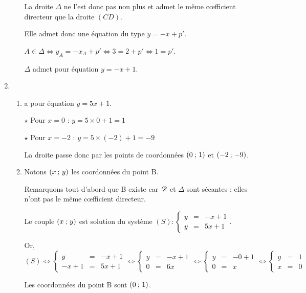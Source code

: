 \documentclass[10pt,french]{article}
\begin{document}
\begin{enumerate}[label=\arabic*.]
\begin{enumerate}[label=\alph*)]
	La droite $\Delta$ ne l'est donc pas non plus et admet le même c\oe{}fficient directeur que la droite $(CD)$.
	
	Elle admet donc une équation du type $y=-x+p'$.
	
	$A\in \Delta\Leftrightarrow y_A=-x_A+p'\Leftrightarrow 3=2+p'\Leftrightarrow 1=p'$.
	
	$\Delta$ admet pour équation $y=-x+1$.
		
	\end{enumerate}

\item 	\begin{enumerate}[label=\alph*)]
	\item {} a pour équation $y=5x+1$.
	
	$\star$ Pour $x=0$ : $y=5\times 0+1=1$
	
	$\star$ Pour $x=-2$ : $y=5\times (-2)+1=-9$
	
	La droite  passe donc par les points de coordonnées $(0\: ; \, 1)$ et $(-2\: ; \, -9)$.
	
	\item Notons $(x\: ; \, y)$ les coordonnées du point B.
	
	Remarquons tout d'abord que B existe car $\mathscr{D}$ et $\Delta$ sont sécantes : elles n'ont pas le même c\oe{}fficient directeur.
	
	Le couple $(x\: ; \, y)$ est solution du système $(S) : \left\{\begin{array}{rcl}
	y&=&-x+1\\
	y&=&5x+1
	\end{array}\right.
	$.
	
	Or, $(S)\Leftrightarrow \left\{\begin{array}{rcl}
	y&=&-x+1\\
	-x+1&=&5x+1
	\end{array}\right.\Leftrightarrow \left\{\begin{array}{rcl}
	y&=&-x+1\\
	0&=&6x
	\end{array}\right.\Leftrightarrow\left\{\begin{array}{rcl}
	y&=&-0+1\\
	0&=&x
	\end{array}\right.\Leftrightarrow \left\{\begin{array}{rcl}
	y&=&1\\
	x&=&0
	\end{array}\right.$
	
	Les coordonnées du point B sont $(0\: ; \, 1)$.
	

\end{enumerate}
\end{enumerate}
\end{document}
